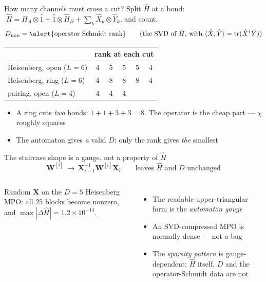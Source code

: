 \documentclass[aspectratio=169,10pt]{beamer}
\newcommand{\numbox}[1]{%
  \begin{tcolorbox}[colback=palegreen,colframe=teal!70!black,title={\bfseries Measured}]
  #1
  \end{tcolorbox}}
\DeclareMathOperator{\tr}{tr}
\newcommand{\bmat}[1]{\bm{#1}}
\newcommand{\hH}{\hat{H}}
\begin{document}
\begin{frame}{How many channels must cross a cut?}
  Split $\hH$ at a bond: $\;\hH=\hH_A\otimes\hat1+\hat1\otimes\hH_B+\sum_k\hat X_k\otimes\hat Y_k$, and count.
  \[
    D_{\min}=\text{\alert{operator Schmidt rank}}
    \qquad\text{(the SVD of $\hH$, with $\langle\hat X,\hat Y\rangle=\tr(\hat X^\dagger\hat Y)$)}
  \]
  \begin{center}\small
  \begin{tabular}{@{}lccccc@{}}\toprule
   & \multicolumn{5}{c}{rank at each cut}\\\midrule
  Heisenberg, open ($L=6$) & 4&5&5&5&4\\
  Heisenberg, \alert{ring} ($L=6$) & 4&8&8&8&4\\
  pairing, open ($L=4$) & 4&4&4&&\\\bottomrule
  \end{tabular}
  \end{center}
  \begin{itemize}
    \item A ring cuts \emph{two} bonds: $1+1+3+3=8$. The operator is the cheap part --- $\chi$ roughly \alert{squares}
    \item The automaton gives \emph{a} valid $D$; only the rank gives \emph{the} smallest
  \end{itemize}
\end{frame}

\begin{frame}{The staircase shape is a gauge, not a property of $\hH$}
  \[
    \bmat W^{[i]}\ \longrightarrow\ \bmat X_{i-1}^{-1}\bmat W^{[i]}\bmat X_i
    \qquad\text{leaves $\hH$ and $D$ unchanged}
  \]
  \begin{columns}[T]
    \numbox{Random $\bmat X$ on the $D=5$ Heisenberg MPO: all $25$ blocks become nonzero, and
    $\max|\Delta\hH|=1.2\times10^{-14}$.}
    \begin{itemize}
      \item The readable upper-triangular form is the \emph{automaton gauge}
      \item An SVD-compressed MPO is normally \alert{dense} --- not a bug
      \item The \emph{sparsity pattern} is gauge-dependent; $\hH$ itself, $D$ and the operator-Schmidt data are not
    \end{itemize}
  \end{columns}
\end{frame}
\end{document}
